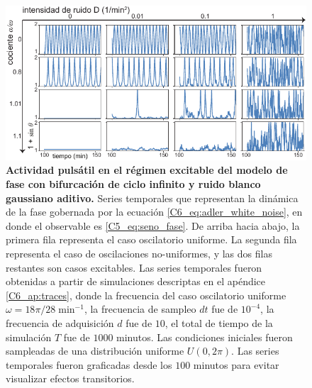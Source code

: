 \documentclass[./main.tex]{subfiles}
\begin{document}
 \begin{figure}
    \centering
    \includegraphics[width=1\columnwidth]{figures/chapter6/C6_traces.pdf} 
    \caption{\textbf{Actividad pulsátil en el régimen excitable del modelo de fase con bifurcación de ciclo infinito y ruido blanco gaussiano aditivo.} Series temporales que representan la dinámica de la fase gobernada por la ecuación \ref{C6_eq:adler_white_noise}, en donde el observable es \ref{C5_eq:seno_fase}. De arriba hacia abajo, la primera fila representa el caso oscilatorio uniforme. La segunda fila representa el caso de oscilaciones no-uniformes, y las dos filas restantes son casos excitables. Las series temporales fueron obtenidas a partir de simulaciones descriptas en el apéndice \ref{C6_ap:traces}, donde la frecuencia del caso oscilatorio uniforme $\omega = 18\pi/28 \; \text{min}^{-1}$, la frecuencia de sampleo $dt$ fue de $10^{-4}$, la frecuencia de adquisición $d$ fue de $10$, el total de tiempo de la simulación $T$ fue de $1000$ minutos. Las condiciones iniciales fueron sampleadas de una distribución uniforme $U(0,2\pi)$. Las series temporales fueron graficadas desde los $100$ minutos para evitar visualizar efectos transitorios.}
    \label{C6_fig:traces} 
\end{figure}
\end{document}
